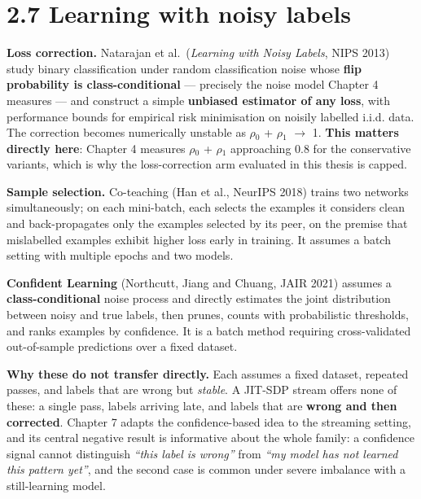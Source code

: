 \section{2.7 Learning with noisy
labels}\label{learning-with-noisy-labels}

\textbf{Loss correction.} Natarajan et al.~(\emph{Learning with Noisy
Labels}, NIPS 2013) study binary classification under random
classification noise whose \textbf{flip probability is
class-conditional} --- precisely the noise model Chapter 4 measures ---
and construct a simple \textbf{unbiased estimator of any loss}, with
performance bounds for empirical risk minimisation on noisily labelled
i.i.d. data. The correction becomes numerically unstable as \ensuremath{\rho}\ensuremath{_0} + \ensuremath{\rho}\ensuremath{_1} \ensuremath{\rightarrow} 1.
\textbf{This matters directly here}: Chapter 4 measures \ensuremath{\rho}\ensuremath{_0} + \ensuremath{\rho}\ensuremath{_1}
approaching 0.8 for the conservative variants, which is why the
loss-correction arm evaluated in this thesis is capped.

\textbf{Sample selection.} Co-teaching (Han et al., NeurIPS 2018) trains
two networks simultaneously; on each mini-batch, each selects the
examples it considers clean and back-propagates only the examples
selected by its peer, on the premise that mislabelled examples exhibit
higher loss early in training. It assumes a batch setting with multiple
epochs and two models.

\textbf{Confident Learning} (Northcutt, Jiang and Chuang, JAIR 2021)
assumes a \textbf{class-conditional} noise process and directly
estimates the joint distribution between noisy and true labels, then
prunes, counts with probabilistic thresholds, and ranks examples by
confidence. It is a batch method requiring cross-validated out-of-sample
predictions over a fixed dataset.

\textbf{Why these do not transfer directly.} Each assumes a fixed
dataset, repeated passes, and labels that are wrong but \emph{stable}. A
JIT-SDP stream offers none of these: a single pass, labels arriving
late, and labels that are \textbf{wrong and then corrected}. Chapter 7
adapts the confidence-based idea to the streaming setting, and its
central negative result is informative about the whole family: a
confidence signal cannot distinguish \emph{``this label is wrong''} from
\emph{``my model has not learned this pattern yet''}, and the second
case is common under severe imbalance with a still-learning model.

